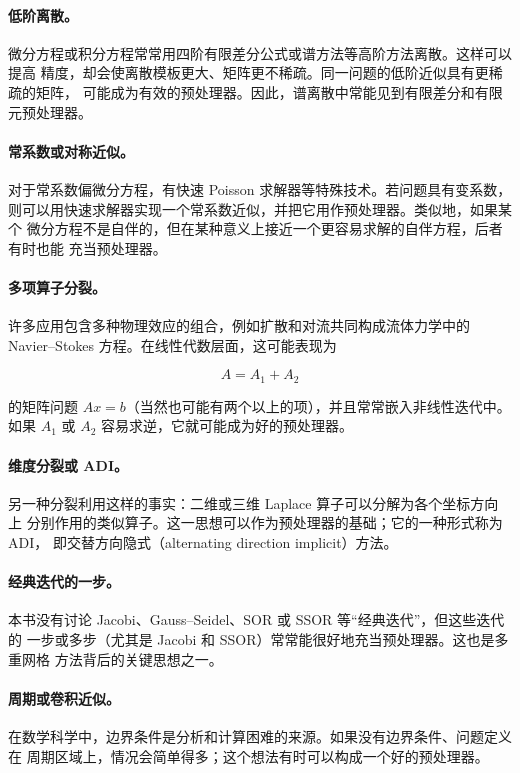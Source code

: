 \documentclass[UTF8,fontset=none,12pt]{ctexart}
\begin{document}
\paragraph{低阶离散。}
微分方程或积分方程常常用四阶有限差分公式或谱方法等高阶方法离散。这样可以提高
精度，却会使离散模板更大、矩阵更不稀疏。同一问题的低阶近似具有更稀疏的矩阵，
可能成为有效的预处理器。因此，谱离散中常能见到有限差分和有限元预处理器。

\paragraph{常系数或对称近似。}
对于常系数偏微分方程，有快速 Poisson 求解器等特殊技术。若问题具有变系数，
则可以用快速求解器实现一个常系数近似，并把它用作预处理器。类似地，如果某个
微分方程不是自伴的，但在某种意义上接近一个更容易求解的自伴方程，后者有时也能
充当预处理器。

\paragraph{多项算子分裂。}
许多应用包含多种物理效应的组合，例如扩散和对流共同构成流体力学中的 Navier--Stokes
方程。在线性代数层面，这可能表现为

\[
A=A_1+A_2
\]

的矩阵问题 $Ax=b$（当然也可能有两个以上的项），并且常常嵌入非线性迭代中。
如果 $A_1$ 或 $A_2$ 容易求逆，它就可能成为好的预处理器。

\paragraph{维度分裂或 ADI。}
另一种分裂利用这样的事实：二维或三维 Laplace 算子可以分解为各个坐标方向上
分别作用的类似算子。这一思想可以作为预处理器的基础；它的一种形式称为 ADI，
即交替方向隐式（alternating direction implicit）方法。

\paragraph{经典迭代的一步。}
本书没有讨论 Jacobi、Gauss--Seidel、SOR 或 SSOR 等“经典迭代”，但这些迭代的
一步或多步（尤其是 Jacobi 和 SSOR）常常能很好地充当预处理器。这也是多重网格
方法背后的关键思想之一。

\paragraph{周期或卷积近似。}
在数学科学中，边界条件是分析和计算困难的来源。如果没有边界条件、问题定义在
周期区域上，情况会简单得多；这个想法有时可以构成一个好的预处理器。
\end{document}
